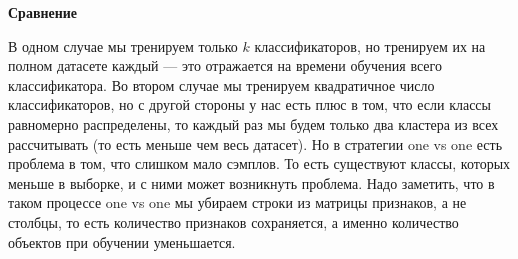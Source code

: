 \textbf{Сравнение}

В одном случае мы тренируем только $k$ классификаторов, но тренируем их на полном датасете каждый --- это отражается на времени обучения всего классификатора. Во втором случае
мы тренируем квадратичное число классификаторов, но с другой стороны у нас есть плюс в том, что если
классы равномерно распределены, то каждый раз мы будем только два кластера из всех рассчитывать (то
есть меньше чем весь датасет). Но в стратегии one vs one есть проблема в том, что слишком мало сэмплов. То
есть существуют классы, которых меньше в выборке, и с ними может возникнуть проблема.
Надо заметить, что в таком процессе one vs one мы убираем строки из матрицы признаков, а не столбцы, то
есть количество признаков сохраняется, а именно количество объектов при обучении уменьшается.